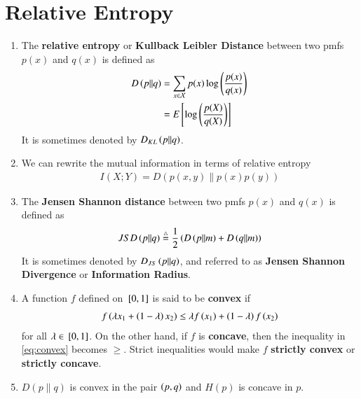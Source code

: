 \documentclass[journal,12pt,twocolumn]{IEEEtran}
\renewcommand\thesection{\arabic{section}}
\begin{document}
\section{Relative Entropy}
\begin{enumerate}[label=\thesection.\arabic*, ref=\thesection.\theenumi]
    \item The \textbf{relative entropy} or \textbf{Kullback Leibler Distance} 
    between two pmfs $p(x)$ and $q(x)$ is defined as 
    \begin{align}
        D\left(p\|q\right) &= \sum_{x\in\mathcal{X}}p(x)\log\left(\frac{p(x)}{q(x)}\right) \label{eq:dkl-1} \\
        &= E{}\left[\log\left(\frac{p(X)}{q(X)}\right)\right] \label{eq:dkl-2}
    \end{align}
    It is sometimes denoted by $D_{KL}\left(p\|q\right)$.
    \item We can rewrite the mutual information in terms of relative entropy 
    \begin{align}
        I(X;Y) = D(p(x,y)\|p(x)p(y)) \label{eq:mutual-info-dkl}
    \end{align}
    \item The \textbf{Jensen Shannon distance} between two pmfs $p(x)$ and 
    $q(x)$ is defined as 
    \begin{align}
        JSD\left(p\|q\right) \stackrel{\triangle}{=} \frac{1}{2}\left(D\left(p\|m\right) + D\left(q\|m\right)\right)
        \label{eq:jsd}
    \end{align}
    It is sometimes denoted by $D_{JS}\left(p\|q\right)$, and referred to as 
    \textbf{Jensen Shannon Divergence} or \textbf{Information Radius}.
    \item A function $f$ defined on ${}\left[0,1\right]$ is said to be \textbf{convex} 
    if
    \begin{align}
        f\left(\lambda x_1 + \left(1 - \lambda\right)x_2\right) \le \lambda f\left(x_1\right) + \left(1-\lambda\right)f\left(x_2\right)
        \label{eq:convex}
    \end{align}
    for all $\lambda \in {}\left[0,1\right]$. On the other hand, if $f$ is \textbf{concave}, 
    then the inequality in \eqref{eq:convex} becomes $\ge$. Strict inequalities
    would make $f$ \textbf{strictly convex} or \textbf{strictly concave}.
    \item $D(p\|q)$ is convex in the pair $\left(p,q\right)$ and $H(p)$ is concave in $p$.
\end{enumerate}
\end{document}
